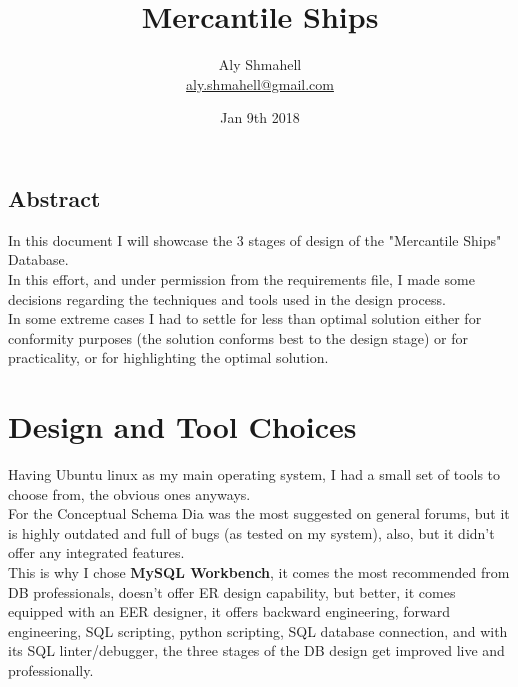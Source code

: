 \documentclass[12pt]{scrartcl}
\begin{document}
	\title{%
		Mercantile Ships
	}
	\author{Aly Shmahell\\%
		\href{aly.shmahell@gmail.com}{aly.shmahell@gmail.com}
	}
	\date{Jan 9th 2018}
	
	\maketitle	
	\newpage
	\begin{center}
		\section*{\hfil \hfil  Abstract \hfil }
	\end{center}
		In this document I will showcase the 3 stages of design of the "Mercantile Ships" Database.\\
		In this effort, and under permission from the requirements file, I made some decisions regarding the techniques and tools used in the design process.\\
		In some extreme cases I had to settle for less than optimal solution either for conformity purposes (the solution conforms best to the design stage) or for practicality, or for highlighting the optimal solution.\\
\newpage
\section*{\textbf{Design and Tool Choices}}
Having Ubuntu linux as my main operating system, I had a small set of tools to choose from, the obvious ones anyways.\\
For the Conceptual Schema Dia was the most suggested on general forums, but it is highly outdated and full of bugs (as tested on my system), also, but it didn't offer any integrated features.\\

This is why I chose \textbf{MySQL Workbench}, it comes the most recommended from DB professionals, doesn't offer ER design capability, but better, it comes equipped with an EER designer, it offers backward engineering, forward engineering, SQL scripting, python scripting, SQL database connection, and with its SQL linter/debugger, the three stages of the DB design get improved live and professionally.\\
\end{document}
